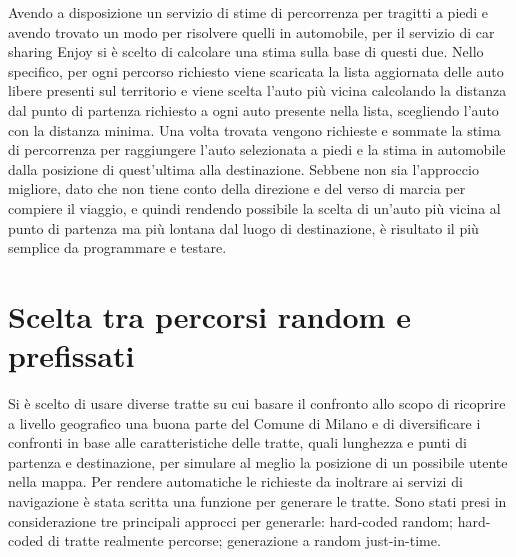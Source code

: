 Avendo a disposizione un servizio di stime di percorrenza per tragitti a piedi e avendo trovato un modo per risolvere quelli in automobile, per il servizio di car sharing Enjoy si è scelto di calcolare una stima sulla base di questi due. Nello specifico, per ogni percorso richiesto viene scaricata la lista aggiornata delle auto libere presenti sul territorio e viene scelta l'auto più vicina calcolando la distanza dal punto di partenza richiesto a ogni auto presente nella lista, scegliendo l'auto con la distanza minima. Una volta trovata vengono richieste e sommate la stima di percorrenza per raggiungere l'auto selezionata a piedi e la stima in automobile dalla posizione di quest'ultima alla destinazione. Sebbene non sia l'approccio migliore, dato che non tiene conto della direzione e del verso di marcia per compiere il viaggio, e quindi rendendo possibile la scelta di un'auto più vicina al punto di partenza ma più lontana dal luogo di destinazione, è risultato il più semplice da programmare e testare.

\section{Scelta tra percorsi random e prefissati}

Si è scelto di usare diverse tratte su cui basare il confronto allo scopo di ricoprire a livello geografico una buona parte del Comune di Milano e di diversificare i confronti in base alle caratteristiche delle tratte, quali lunghezza e punti di partenza e destinazione, per simulare al meglio la posizione di un possibile utente nella mappa. Per rendere automatiche le richieste da inoltrare ai servizi di navigazione è stata scritta una funzione per generare le tratte. Sono stati presi in considerazione tre principali approcci per generarle: hard-coded random; hard-coded di tratte realmente percorse; generazione a random just-in-time.

